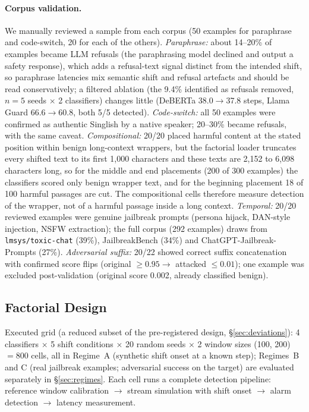 \documentclass{article}
\begin{document}
\paragraph{Corpus validation.} We manually reviewed a sample from each corpus (50 examples for paraphrase and code-switch, 20 for each of the others). \emph{Paraphrase:} about 14--20\% of examples became LLM refusals (the paraphrasing model declined and output a safety response), which adds a refusal-text signal distinct from the intended shift, so paraphrase latencies mix semantic shift and refusal artefacts and should be read conservatively; a filtered ablation (the 9.4\% identified as refusals removed, $n{=}5$ seeds $\times$ 2 classifiers) changes little (DeBERTa 38.0$\rightarrow$37.8 steps, Llama Guard 66.6$\rightarrow$60.8, both 5/5 detected). \emph{Code-switch:} all 50 examples were confirmed as authentic Singlish by a native speaker; 20--30\% became refusals, with the same caveat. \emph{Compositional:} 20/20 placed harmful content at the stated position within benign long-context wrappers, but the factorial loader truncates every shifted text to its first 1{,}000 characters and these texts are 2{,}152 to 6{,}098 characters long, so for the middle and end placements (200 of 300 examples) the classifiers scored only benign wrapper text, and for the beginning placement 18 of 100 harmful passages are cut. The compositional cells therefore measure detection of the wrapper, not of a harmful passage inside a long context. \emph{Temporal:} 20/20 reviewed examples were genuine jailbreak prompts (persona hijack, DAN-style injection, NSFW extraction); the full corpus (292 examples) draws from \texttt{lmsys/toxic-chat} (39\%), JailbreakBench (34\%) and ChatGPT-Jailbreak-Prompts (27\%). \emph{Adversarial suffix:} 20/22 showed correct suffix concatenation with confirmed score flips (original $\geq 0.95 \rightarrow$ attacked $\leq 0.01$); one example was excluded post-validation (original score 0.002, already classified benign).

\subsection{Factorial Design}
\label{sec:factorial}

Executed grid (a reduced subset of the pre-registered design, \S\ref{sec:deviations}): 4 classifiers $\times$ 5 shift conditions $\times$ 20 random seeds $\times$ 2 window sizes (100, 200) $= 800$ cells, all in Regime~A (synthetic shift onset at a known step); Regimes~B and C (real jailbreak examples; adversarial success on the target) are evaluated separately in \S\ref{sec:regimes}. Each cell runs a complete detection pipeline: reference window calibration $\rightarrow$ stream simulation with shift onset $\rightarrow$ alarm detection $\rightarrow$ latency measurement.
\end{document}
